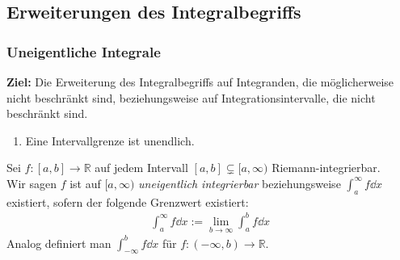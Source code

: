 
\subsection{Erweiterungen des Integralbegriffs}

\subsubsection{Uneigentliche Integrale}

\textbf{Ziel:} Die Erweiterung des Integralbegriffs auf Integranden, die 
möglicherweise nicht beschränkt sind, beziehungsweise auf Integrationsintervalle, 
die nicht beschränkt sind.

\begin{enumerate}
	\item Eine Intervallgrenze ist unendlich.
\end{enumerate}

\begin{Definition}{
	Sei $f : [a,b] \rightarrow \mathbb{R}$ auf jedem Intervall $[a,b] \subsetneq
	[a, \infty)$ Riemann-integrierbar. \\
	Wir sagen $f$ ist auf $[a, \infty)$ \emph{uneigentlich integrierbar} 
	beziehungsweise $\int_a^{\infty} f \dd{x}$ existiert, sofern der 
	folgende Grenzwert existiert:
	\begin{align*}
		\int_a^{\infty} f \dd{x} := \lim\limits_{b \rightarrow \infty}
			{\int_a^b f \dd{x}}
	\end{align*}
	Analog definiert man $\int_{-\infty}^b f \dd{x}$ für $f: (-\infty, b)
	 \rightarrow \mathbb{R}$.
}\end{Definition}

